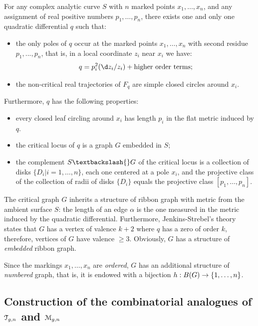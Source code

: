 \begin{theorem} For any complex
  analytic curve $S$ with $n$ marked points $x_1, \ldots, x_n$, and any
  assignment of real positive numbers $p_1, \ldots, p_n$, there exists one
  and only one quadratic differential $q$ such that:
  \begin{itemize}
  \item the only poles of $q$ occur at the marked points $x_1, \ldots, x_n$
    with second residue $p_1, ..., p_n$, that is, in a local
    coordinate $z_i$ near $x_i$ we have:
    \begin{equation*}
      q = p_i^2 (\d z_i / z_i) + \text{higher order terms};
    \end{equation*}
  \item the non-critical real trajectories of $F_q$ are simple closed
    circles around $x_i$.
  \end{itemize}
  Furthermore, $q$ has the following properties:
  \begin{itemize}
  \item every closed leaf circling around $x_i$ has length $p_i$ in the flat
    metric induced by $q$.
  \item the critical locus of $q$ is a graph $G$ embedded in $S$;
  \item the complement $S \textbackslash{} G$ of the critical locus is a collection
    of disks $\{D_i | i=1,\ldots,n\}$, each one centered at a pole $x_i$, and
    the projective class of the collection of radii of disks $\{D_i\}$
    equals the projective class $[p_1, \ldots, p_n]$.
  \end{itemize}
\end{theorem}
The critical graph $G$ inherits a structure of ribbon graph with
metric from the ambient surface $S$: the length of an edge $\alpha$ is the
one measured in the metric induced by the quadratic differential.
Furthermore, Jenkins-Strebel's theory states that $G$ has a vertex of
valence $k+2$ where $q$ has a zero of order $k$, therefore, vertices
of $G$ have valence $\geq3$.  Obviously, $G$ has a structure of
\emph{embedded} ribbon graph.

Since the markings $x_1, \ldots, x_n$ are \emph{ordered}, $G$ has an
additional structure of \emph{numbered} graph, that is, it is endowed
with a bijection $h: B(G) \to \{1, \ldots, n\}$.


\subsection{Construction of the combinatorial analogues of $\mathcal{T}_{g,n}$
  and $\mathcal{M}_{g,n}$}
\label{sec:mgn-comb-construction}

